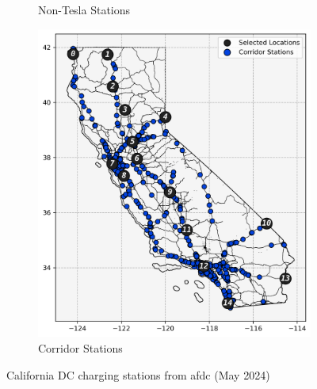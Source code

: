 \documentclass[11pt]{article}
\begin{document}
\begin{figure}[H]
\begin{subfigure}{\linewidth/3}
		\caption{Non-Tesla Stations}
	\end{subfigure}
	\begin{subfigure}{\linewidth/3}
		\centering
		\includegraphics[width = \linewidth]{figs/California_SNG_Corridor.png}
		\caption{Corridor Stations}
	\end{subfigure}
	\caption{California DC charging stations from \gls{afdc} (May 2024)}
	\label{fig:california_stations}
\end{figure}
\end{document}
